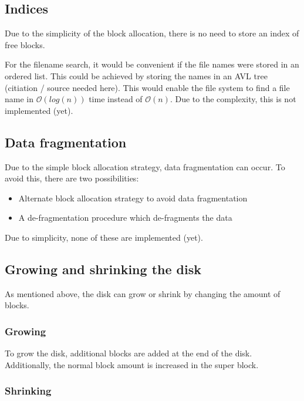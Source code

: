 \documentclass[a4paper,12pt]{article}
\begin{document}
\subsection{Indices}

Due to the simplicity of the block allocation, there is no need to store an index of free blocks.

For the filename search, it would be convenient if the file names were stored in an ordered list. This could be achieved by storing the names in an AVL tree (citiation / source needed here). This would enable the file system to
find a file name in $\mathcal{O}(log(n))$ time instead of $\mathcal{O}(n)$. Due to the complexity, this is not implemented (yet).

\subsection{Data fragmentation}

Due to the simple block allocation strategy, data fragmentation can occur. To avoid this, there are two possibilities:

\begin{itemize}
  \item Alternate block allocation strategy to avoid data fragmentation
  \item A de-fragmentation procedure which de-fragments the data
\end{itemize}

Due to simplicity, none of these are implemented (yet).

\subsection{Growing and shrinking the disk}

As mentioned above, the disk can grow or shrink by changing the amount of blocks.

\subsubsection{Growing}

To grow the disk, additional blocks are added at the end of the disk. Additionally, the normal block amount is increased in the super block.

\subsubsection{Shrinking}
\end{document}
